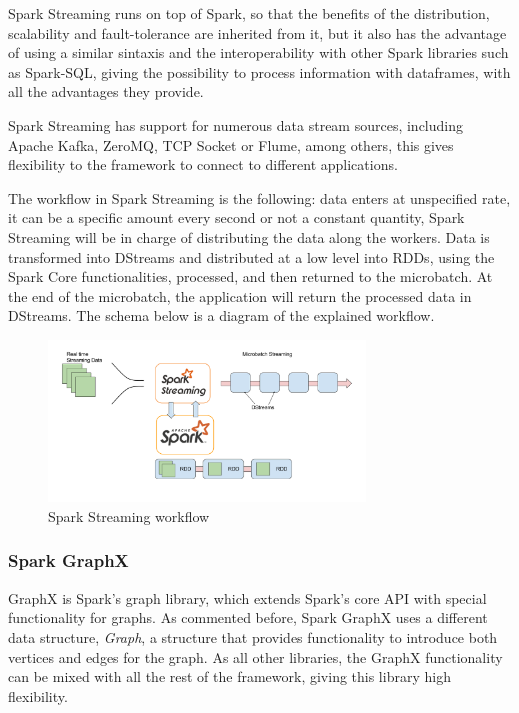 \documentclass[11pt]{book} %
\begin{document}
          Spark Streaming runs on top of Spark, so that the benefits of the distribution, scalability and fault-tolerance are inherited from it, but it also has the advantage of using a similar sintaxis and the interoperability with other Spark libraries such as Spark-SQL, giving the possibility to process information with dataframes, with all the advantages they provide.

          Spark Streaming has support for numerous data stream sources, including Apache Kafka, ZeroMQ, TCP Socket or Flume, among others, this gives flexibility to the framework to connect to different applications.

          The workflow in Spark Streaming is the following: data enters at unspecified rate, it can be a specific amount every second or not a constant quantity, Spark Streaming will be in charge of distributing the data along the workers. Data is transformed into DStreams and distributed at a low level into RDDs, using the Spark Core functionalities, processed, and then returned to the microbatch. At the end of the microbatch, the application will return the processed data in DStreams. The schema below is a diagram of the explained workflow.

          \begin{figure}[!ht]
            \centering
            \includegraphics[width=0.75\textwidth]{Spark_Streaming_architecture.png}
            \caption{Spark Streaming workflow}
            \label{img:spark_streaming_workflow}
          \end{figure}


        \subsubsection{Spark GraphX}

          GraphX is Spark's graph library, which extends Spark's core API with special functionality for graphs. As commented before, Spark GraphX uses a different data structure, \emph{Graph}, a structure that provides functionality to introduce both vertices and edges for the graph. As all other libraries, the GraphX functionality can be mixed with all the rest of the framework, giving this library high flexibility.
\end{document}

